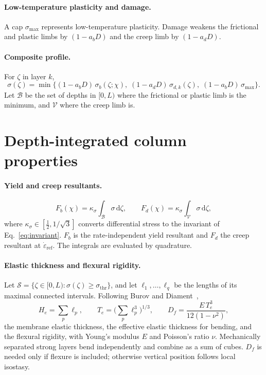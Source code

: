 \documentclass[11pt]{article}
\newcommand{\dd}{\,\mathrm{d}}
\begin{document}
\paragraph{Low-temperature plasticity and damage.}
A cap $\sigma_{\max}$ represents low-temperature plasticity. Damage weakens the
frictional and plastic limbs by $(1-a_bD)$ and the creep limb by $(1-a_dD)$.

\paragraph{Composite profile.}
For $\zeta$ in layer $k$,
\begin{equation}
  \sigma(\zeta) = \min\Big\{
    (1-a_bD)\,\sigma_b(\zeta;\chi),\;
    (1-a_dD)\,\sigma_{d,k}(\zeta),\;
    (1-a_bD)\,\sigma_{\max}
  \Big\}.
  \label{eq:envelope}
\end{equation}
Let $\mathcal{B}$ be the set of depths in $[0,L)$ where the frictional or plastic
limb is the minimum, and $\mathcal{V}$ where the creep limb is.

\section{Depth-integrated column properties}
\label{sec:integrated}

\paragraph{Yield and creep resultants.}
\begin{equation}
  F_b(\chi) = \kappa_\sigma \int_{\mathcal{B}} \sigma\dd\zeta,
  \qquad
  F_d(\chi) = \kappa_\sigma \int_{\mathcal{V}} \sigma\dd\zeta,
  \label{eq:resultants}
\end{equation}
where $\kappa_\sigma \in [\tfrac12, 1/\sqrt3]$ converts differential stress to
the invariant of Eq.~\eqref{eq:invariant}. $F_b$ is the rate-independent yield
resultant and $F_d$ the creep resultant at $\dot\varepsilon_{\mathrm{ref}}$. The
integrals are evaluated by quadrature.

\paragraph{Elastic thickness and flexural rigidity.}
Let $\mathcal{S} = \{\zeta\in[0,L): \sigma(\zeta)\ge\sigma_{\mathrm{thr}}\}$, and
let $\ell_1,\dots,\ell_q$ be the lengths of its maximal connected intervals.
Following Burov and Diament~\cite{BurovDiament1995},
\begin{equation}
  H_e = \sum_p \ell_p,
  \qquad
  T_e = \Big(\sum_p \ell_p^3\Big)^{1/3},
  \qquad
  D_f = \frac{E\,T_e^3}{12(1-\nu^2)},
\end{equation}
the membrane elastic thickness, the effective elastic thickness for bending, and
the flexural rigidity, with Young's modulus $E$ and Poisson's ratio $\nu$.
Mechanically separated strong layers bend independently and combine as a sum of
cubes. $D_f$ is needed only if flexure is included; otherwise vertical position
follows local isostasy.
\end{document}
